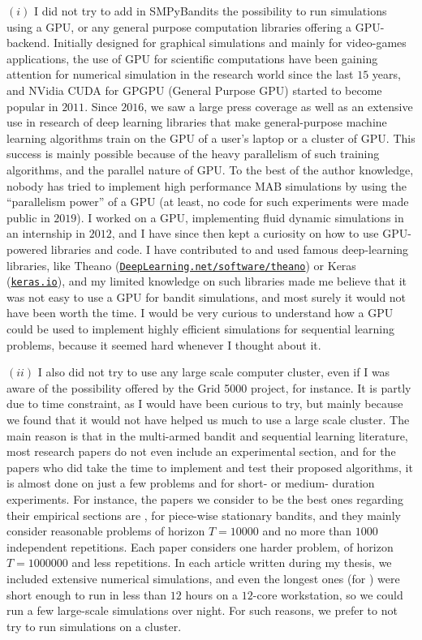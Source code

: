 $(i)$ I did not try to add in SMPyBandits the possibility to run simulations using a GPU, or any general purpose computation libraries offering a GPU-backend.
Initially designed for graphical simulations and mainly for video-games applications, the use of GPU for scientific computations have been gaining attention for numerical simulation in the research world since the last $15$ years, and NVidia CUDA for GPGPU (General Purpose GPU) started to become popular in $2011$.
Since $2016$, we saw a large press coverage as well as an extensive use in research of deep learning libraries that make general-purpose machine learning algorithms train on the GPU of a user's laptop or a cluster of GPU.
This success is mainly possible because of the heavy parallelism of such training algorithms, and the parallel nature of GPU.
To the best of the author knowledge, nobody has tried to implement high performance MAB simulations by using the ``parallelism power'' of a GPU (at least, no code for such experiments were made public in $2019$).
I worked on a GPU, implementing fluid dynamic simulations in an internship in $2012$, and I have since then kept a curiosity on how to use GPU-powered libraries and code.
I have contributed to and used famous deep-learning libraries, like Theano (\href{http://deeplearning.net/software/theano/}{\texttt{DeepLearning.net/software/theano}}) or Keras (\href{https://keras.io/}{\texttt{keras.io}}), and my limited knowledge on such libraries made me believe that it was not easy to use a GPU for bandit simulations, and most surely it would not have been worth the time.
I would be very curious to understand how a GPU could be used to implement highly efficient simulations for sequential learning problems, because it seemed hard whenever I thought about it.

$(ii)$ I also did not try to use any large scale computer cluster, even if I was aware of the possibility offered by the Grid 5000 project, for instance.
It is partly due to time constraint, as I would have been curious to try, but mainly because we found that it would not have helped us much to use a large scale cluster.
The main reason is that in the multi-armed bandit and sequential learning literature, most research papers do not even include an experimental section, and for the papers who did take the time to implement and test their proposed algorithms, it is almost done on just a few problems and for short- or medium- duration experiments.
For instance, the papers we consider to be the best ones regarding their empirical sections are \cite{LiuLeeShroff17,CaoZhenKvetonXie18}, for piece-wise stationary bandits, and they mainly consider reasonable problems of horizon $T=10000$ and no more than $1000$ independent repetitions. Each paper considers one harder problem, of horizon $T=1000000$ and less repetitions.
%
In each article written during my thesis, we included extensive numerical simulations, and even the longest ones (for \cite{Besson2019GLRT}) were short enough to run in less than $12$ hours on a $12$-core workstation, so we could run a few large-scale simulations over night.
For such reasons, we prefer to not try to run simulations on a cluster.
